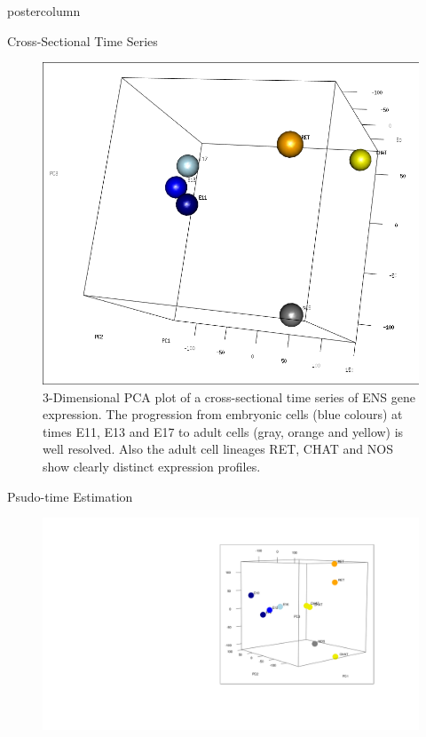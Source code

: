 \documentclass{beamer}
\begin{document}
\begin{frame}
\begin{columns}
\begin{column}{.45\textwidth}
\begin{beamercolorbox}[center]{postercolumn}
\begin{minipage}{.98\textwidth}
{\begin{myblock}{Cross-Sectional Time Series}
\begin{figure}
\begin{minipage}{1.0\textwidth}
	\centering\includegraphics[width=1.0\textwidth]{./time_series}
	\caption{3-Dimensional PCA plot of a cross-sectional time series of ENS
			gene expression. The progression from embryonic cells (blue colours)
			at times E11, E13 and E17 to adult cells (gray, orange and yellow)
			is well resolved. Also the adult cell lineages RET, CHAT and NOS
			show clearly distinct expression profiles.}
	\label{fig:timeseries}
\end{minipage}
\end{figure}
\end{myblock}\vfill
\begin{myblock}{Psudo-time Estimation}
\cite{Reid_2016}
\begin{figure}
\begin{minipage}{\textwidth}
	\centering\includegraphics[width=1.0\textwidth]{./bulk_3d}

\end{minipage}
\end{figure}
\end{myblock}}
\end{minipage}
\end{beamercolorbox}
\end{column}
\end{columns}
\end{frame}
\end{document}
